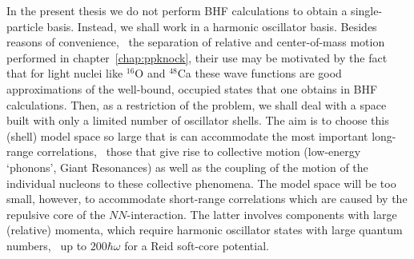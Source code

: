 In the present thesis we do not perform BHF calculations to obtain a 
single-particle basis. Instead, we shall work in a harmonic oscillator basis. 
Besides reasons of convenience, \eg\ the separation of relative and 
center-of-mass motion performed in chapter~\ref{chap:ppknock}, their use may be 
motivated by the fact that for light nuclei like $^{16}$O and $^{48}$Ca 
these wave functions are good approximations of the well-bound, occupied 
states that one obtains in BHF calculations. Then, as a restriction of the 
problem, we shall deal with a space built with only a limited number of 
oscillator shells. The aim is to choose this (shell) model space so large
that is can accommodate the most important long-range correlations, \eg\ those 
that give rise to collective motion (low-energy `phonons', 
Giant Resonances) as well as the coupling of the motion of the individual 
nucleons to these collective phenomena.
The model space will be too small, however, to accommodate short-range 
correlations which are caused by the repulsive core of the $NN$-interaction. 
The latter involves components with large (relative) momenta, which require 
harmonic oscillator states with large quantum numbers, \eg\ up to 
$200 \hbar\omega$ for a Reid soft-core potential\cite{MS93a}.

